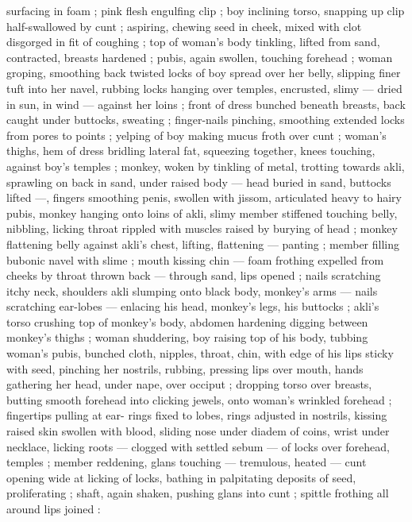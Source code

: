 surfacing in foam ; pink flesh engulfing clip ; boy inclining torso, 
snapping up clip half-swallowed by cunt ; aspiring, chewing seed in 
cheek, mixed with clot disgorged in fit of coughing ; top of woman's 
body tinkling, lifted from sand, contracted, breasts hardened ; pubis, 
again swollen, touching forehead ; woman groping, smoothing back 
twisted locks of boy spread over her belly, slipping finer tuft into her 
navel, rubbing locks hanging over temples, encrusted, slimy --- dried 
in sun, in wind --- against her loins ; front of dress bunched beneath 
breasts, back caught under buttocks, sweating ; finger-nails pinching, 
smoothing extended locks from pores to points ; yelping of boy 
making mucus froth over cunt ; woman's thighs, hem of dress 
bridling lateral fat, squeezing together, knees touching, against 
boy's temples ; monkey, woken by tinkling of metal, trotting towards 
akli, sprawling on back in sand, under raised body --- head buried in 
sand, buttocks lifted ---, fingers smoothing penis, swollen with 
jissom, articulated heavy to hairy pubis, monkey hanging onto loins 
of akli, slimy member stiffened touching belly, nibbling, licking throat 
rippled with muscles raised by burying of head ; monkey flattening 
belly against akli's chest, lifting, flattening --- panting ; member 
filling bubonic navel with slime ; mouth kissing chin --- foam frothing 
expelled from cheeks by throat thrown back --- through sand, lips 
opened ; nails scratching itchy neck, shoulders {\col} akli slumping onto 
black body, monkey's arms --- nails scratching ear-lobes --- enlacing 
his head, monkey's legs, his buttocks ; akli's torso crushing top of 
monkey's body, abdomen hardening digging between monkey's 
thighs ; woman shuddering, boy raising top of his body, tubbing 
woman's pubis, bunched cloth, nipples, throat, chin, with edge of his 
lips sticky with seed, pinching her nostrils, rubbing, pressing lips 
over mouth, hands gathering her head, under nape, over occiput ; 
dropping torso over breasts, butting smooth forehead into clicking 
jewels, onto woman's wrinkled forehead ; fingertips pulling at ear- 
rings fixed to lobes, rings adjusted in nostrils, kissing raised skin 
swollen with blood, sliding nose under diadem of coins, wrist under 
necklace, licking roots --- clogged with settled sebum --- of locks 
over forehead, temples ; member reddening, glans touching --- 
tremulous, heated --- cunt opening wide at licking of locks, bathing 
in palpitating deposits of seed, proliferating ; shaft, again shaken, 
pushing glans into cunt ; spittle frothing all around lips joined : 
